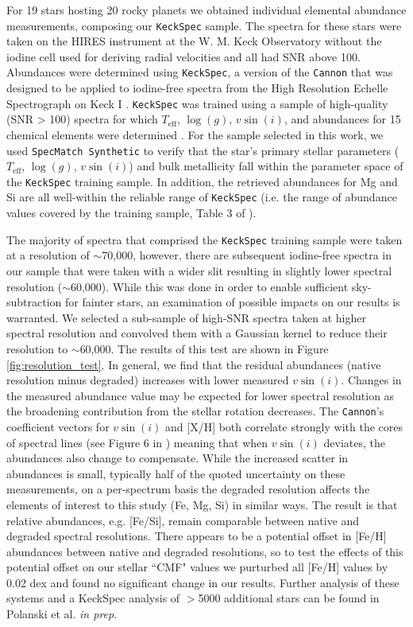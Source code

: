\documentclass[twocolumn]{aastex631}
\begin{document}
For 19 stars hosting 20 rocky planets we obtained individual elemental abundance measurements, composing our \texttt{KeckSpec} sample. The spectra for these stars were taken on the HIRES instrument at the W. M. Keck Observatory \citep{1994SPIE.2198..362V} without the iodine cell used for deriving radial velocities and all had SNR above 100. Abundances were determined using \texttt{KeckSpec}, a version of the \texttt{Cannon} \citep{2015ApJ...808...16N} that was designed to be applied to iodine-free spectra from the High Resolution Echelle Spectrograph on Keck I \citep{Rice2020}. \texttt{KeckSpec} was trained using a sample of high-quality (SNR > 100) spectra for which $T_{\text{eff}}$, $\log{(g)}$, $v\sin{(i)}$, and abundances for 15 chemical elements were determined \citep{Brewer_2016}. For the sample selected in this work, we used \texttt{SpecMatch Synthetic} \citep{Petigura2015PhDT........82P} to verify that the star's primary stellar parameters ($T_{\text{eff}}$, $\log{(g)}$, $v\sin{(i)}$) and bulk metallicity fall within the parameter space of the \texttt{KeckSpec} training sample. In addition, the retrieved abundances for Mg and Si are all well-within the reliable range of \texttt{KeckSpec} (i.e. the range of abundance values covered by the training sample, Table 3 of \citealt{Rice2020}).

The majority of spectra that comprised the \texttt{KeckSpec} training sample were taken at a resolution of $\sim$70,000, however, there are subsequent iodine-free spectra in our sample that were taken with a wider slit resulting in slightly lower spectral resolution ($\sim$60,000). While this was done in order to enable sufficient sky-subtraction for fainter stars, an examination of possible impacts on our results is warranted. We selected a sub-sample of high-SNR spectra taken at higher spectral resolution and convolved them with a Gaussian kernel to reduce their resolution to $\sim$60,000. The results of this test are shown in Figure \ref{fig:resolution_test}. In general, we find that the residual abundances (native resolution minus degraded) increases with lower measured $v\sin{(i)}$. Changes in the measured abundance value may be expected for lower spectral resolution as the broadening contribution from the stellar rotation decreases. The \texttt{Cannon}'s coefficient vectors for $v\sin{(i)}$ and [X/H] both correlate strongly with the cores of spectral lines (see Figure 6 in \cite{Rice2020}) meaning that when $v\sin{(i)}$ deviates, the abundances also change to compensate. While the increased scatter in abundances is small, typically half of the quoted uncertainty on these measurements, on a per-spectrum basis the degraded resolution affects the elements of interest to this study (Fe, Mg, Si) in similar ways. The result is that relative abundances, e.g. [Fe/Si], remain comparable between native and degraded spectral resolutions. There appears to be a potential offset in [Fe/H] abundances between native and degraded resolutions, so to test the effects of this potential offset on our stellar ``CMF" values we purturbed all [Fe/H] values by 0.02 dex and found no significant change in our results. Further analysis of these systems and a KeckSpec analysis of $>$5000 additional stars can be found in Polanski et al. \textit{in prep}.
\end{document}
